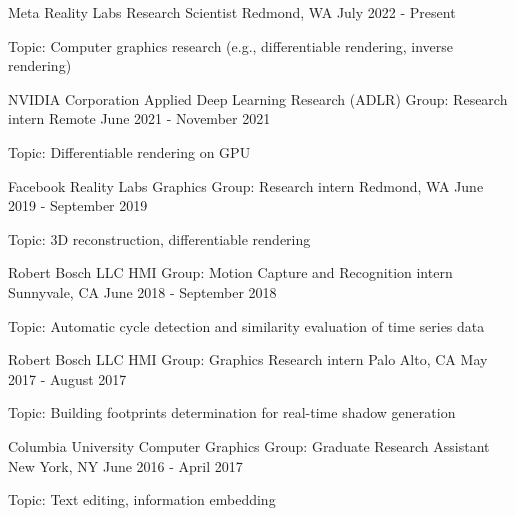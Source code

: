 
\begin{cventries}

  \cventry
	{Meta Reality Labs}
	{Research Scientist}
	{Redmond, WA}
	{July 2022 - Present}
	{
		\begin{cvitems}
			\item{Topic: Computer graphics research (e.g., differentiable rendering, inverse rendering) }
		\end{cvitems}
	}

  \cventry
	{NVIDIA Corporation}
	{Applied Deep Learning Research (ADLR) Group: Research intern}
	{Remote}
	{June 2021 - November 2021}
	{
		\begin{cvitems}
			\item{Topic: Differentiable rendering on GPU}
		\end{cvitems}
	}

  \cventry
  	{Facebook Reality Labs}
  	{Graphics Group: Research intern}
  	{Redmond, WA}
  	{June 2019 - September 2019}
  	{
   		\begin{cvitems}
      		\item{Topic: 3D reconstruction, differentiable rendering}
    	\end{cvitems}
  	}

  \cventry
    {Robert Bosch LLC}
    {HMI Group: Motion Capture and Recognition intern}
    {Sunnyvale, CA}
    {June 2018 - September 2018}
    {
      \begin{cvitems}
        \item{Topic: Automatic cycle detection and similarity evaluation of time series data}
 		\end{cvitems}
    }

  \cventry
    {Robert Bosch LLC}
    {HMI Group: Graphics Research intern}
    {Palo Alto, CA}
    {May 2017 - August 2017}
    {
      \begin{cvitems}
        \item{Topic: Building footprints determination for real-time shadow generation}
      \end{cvitems}
    }

  \cventry
    {Columbia University}
    {Computer Graphics Group: Graduate Research Assistant}
    {New York, NY}
    {June 2016 - April 2017}
    {
      \begin{cvitems}
        \item{Topic: Text editing, information embedding }
      \end{cvitems}
    }

\end{cventries}
